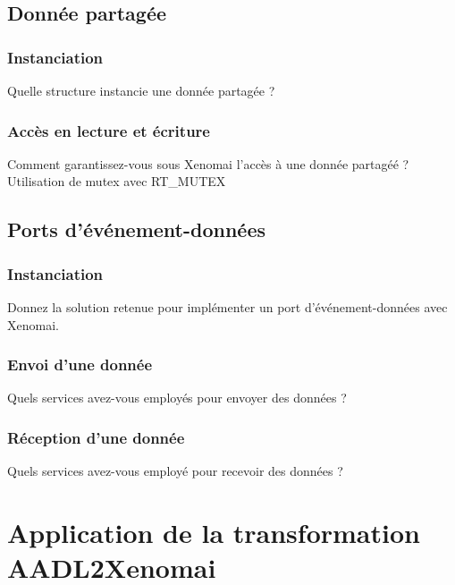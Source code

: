 \documentclass[11pt, a4paper]{paper}
\begin{document}
\subsection{Donnée partagée}

\subsubsection{Instanciation}
 {\color{blue} Quelle structure instancie une donnée partagée ?}

\subsubsection{Accès en lecture et écriture}
 {\color{blue} Comment garantissez-vous sous Xenomai l'accès à une donnée partagéé ? \\}
 {\color{black} Utilisation de mutex avec RT\_MUTEX}

\subsection{Ports d’événement-données}

\subsubsection{Instanciation}
 {\color{blue} Donnez la solution retenue pour implémenter un port d'événement-données avec Xenomai.}

\subsubsection{Envoi d’une donnée}
 {\color{blue} Quels services avez-vous employés pour envoyer des données ?}

\subsubsection{Réception d’une donnée}
 {\color{blue} Quels services avez-vous employé pour recevoir des données ?}

\section{Application de la transformation AADL2Xenomai}
\end{document}
